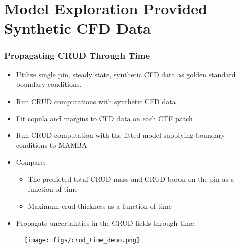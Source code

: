 \documentclass[t, pdftex]{beamer}
\DeclareMathOperator*{\E}{\mathbb{E}}
\begin{document}
\section[Model Exploration]{Model Exploration Provided Synthetic CFD Data}
\begin{frame}[shrink=2]
\frametitle{Propagating CRUD Through Time}
\begin{itemize}
\item Utilize single pin, steady state, synthetic CFD data as golden standard boundary conditions.
\item Run CRUD computations with synthetic CFD data 
\item Fit copula and margins to CFD data on each CTF patch 
\item Run CRUD computation with the fitted model supplying boundary conditions to MAMBA
\item Compare:
\begin{itemize}
\item The predicted total CRUD mass and CRUD boron on the pin as a function of time
\item Maximum crud thickness as a function of time
\end{itemize}
\item Propagate uncertainties in the CRUD fields through time.
\end{itemize}
\begin{figure}[!htbp]
\centering
\texttt{[image: figs/crud\_time\_demo.png]}
\label{model_overview}
\end{figure}
\end{frame}


%	
%	
%	
%	
%	
\end{document}

